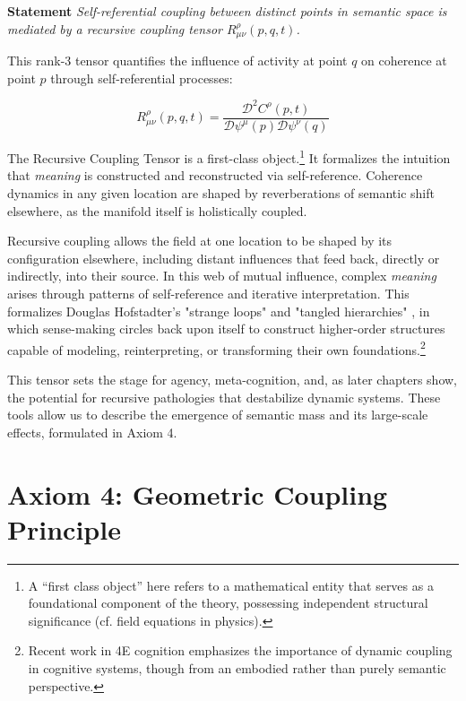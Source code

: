\textbf{Statement} \textit{Self-referential coupling between distinct points in semantic space is mediated by a recursive coupling tensor \(R^\rho_{\mu\nu}(p,q,t)\).}

This rank-3 tensor quantifies the influence of activity at point \(q\) on coherence at point \(p\) through self-referential processes:

\begin{equation}
R^\rho_{\mu\nu}(p,q,t) = \frac{\mathcal{D}^2 C^\rho(p,t)}{\mathcal{D} \psi^\mu(p) \mathcal{D} \psi^\nu(q)}
\end{equation}

The Recursive Coupling Tensor is a first-class object.\footnote{A “first class object” here refers to a mathematical entity that serves as a foundational component of the theory, possessing independent structural significance (cf. field equations in physics).} It formalizes the intuition that \textit{meaning} is constructed and reconstructed via self-reference. Coherence dynamics in any given location are shaped by reverberations of semantic shift elsewhere, as the manifold itself is holistically coupled.

Recursive coupling allows the field at one location to be shaped by its configuration elsewhere, including distant influences that feed back, directly or indirectly, into their source. In this web of mutual influence, complex \textit{meaning} arises through patterns of self-reference and iterative interpretation. This formalizes Douglas Hofstadter's "strange loops" and "tangled hierarchies" \autocite{Hofstadter1979, Hofstadter2007}, in which sense-making circles back upon itself to construct higher-order structures capable of modeling, reinterpreting, or transforming their own foundations.\footnote{Recent work in 4E cognition \autocite{Newen2018, Gallagher2020} emphasizes the importance of dynamic coupling in cognitive systems, though from an embodied rather than purely semantic perspective.}

This tensor sets the stage for agency, meta-cognition, and, as later chapters show, the potential for recursive pathologies that destabilize dynamic systems. These tools allow us to describe the emergence of semantic mass and its large-scale effects, formulated in Axiom 4.


\section{Axiom 4: Geometric Coupling Principle}
\label{1.4:axiom_4_geometric_coupling_principle}

